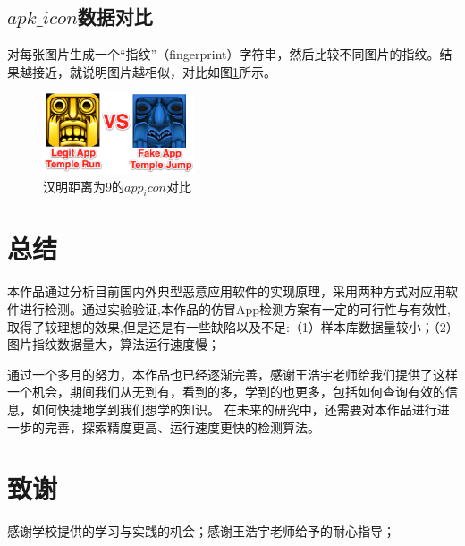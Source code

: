\documentclass[UTF8,a4paper,10pt, twocolumn]{ctexart}
\begin{document}
\subsection{$apk\_icon$数据对比}
对每张图片生成一个“指纹”（fingerprint）字符串，然后比较不同图片的指纹。结果越接近，就说明图片越相似，对比如图\ref{figure:zju9}所示。

\begin{figure}[htbp]
  \centering
  \includegraphics[width=0.4\textwidth]{img/fig11.png}
  \caption{汉明距离为9的$app_icon$对比}
  \label{figure:zju9}
  \end{figure}

\section{总结}
本作品通过分析目前国内外典型恶意应用软件的实现原理，采用两种方式对应用软件进行检测。通过实验验证,本作品的仿冒App检测方案有一定的可行性与有效性,取得了较理想的效果,但是还是有一些缺陷以及不足:（1）样本库数据量较小；（2）图片指纹数据量大，算法运行速度慢；

通过一个多月的努力，本作品也已经逐渐完善，感谢王浩宇老师给我们提供了这样一个机会，期间我们从无到有，看到的多，学到的也更多，包括如何查询有效的信息，如何快捷地学到我们想学的知识。
在未来的研究中，还需要对本作品进行进一步的完善，探索精度更高、运行速度更快的检测算法。

\section{致谢}
感谢学校提供的学习与实践的机会；感谢王浩宇老师给予的耐心指导；
\end{document}
